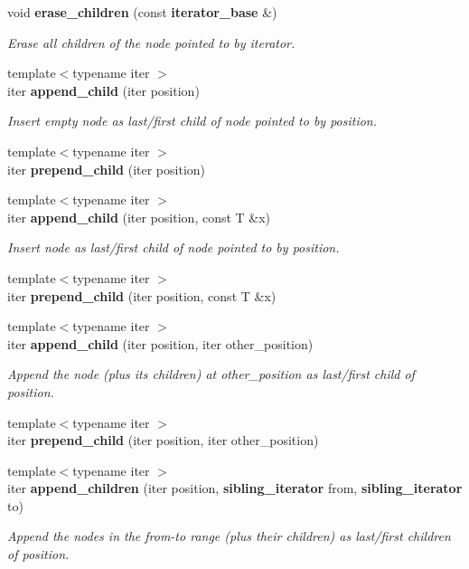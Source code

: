 \begin{DoxyCompactItemize}
void {\bf erase\+\_\+children} (const {\bf iterator\+\_\+base} \&)
\begin{DoxyCompactList}\small\item\em Erase all children of the node pointed to by iterator. \end{DoxyCompactList}\item 
{\footnotesize template$<$typename iter $>$ }\\iter {\bf append\+\_\+child} (iter position)
\begin{DoxyCompactList}\small\item\em Insert empty node as last/first child of node pointed to by position. \end{DoxyCompactList}\item 
{\footnotesize template$<$typename iter $>$ }\\iter {\bf prepend\+\_\+child} (iter position)
\item 
{\footnotesize template$<$typename iter $>$ }\\iter {\bf append\+\_\+child} (iter position, const T \&x)
\begin{DoxyCompactList}\small\item\em Insert node as last/first child of node pointed to by position. \end{DoxyCompactList}\item 
{\footnotesize template$<$typename iter $>$ }\\iter {\bf prepend\+\_\+child} (iter position, const T \&x)
\item 
{\footnotesize template$<$typename iter $>$ }\\iter {\bf append\+\_\+child} (iter position, iter other\+\_\+position)
\begin{DoxyCompactList}\small\item\em Append the node (plus its children) at other\+\_\+position as last/first child of position. \end{DoxyCompactList}\item 
{\footnotesize template$<$typename iter $>$ }\\iter {\bf prepend\+\_\+child} (iter position, iter other\+\_\+position)
\item 
{\footnotesize template$<$typename iter $>$ }\\iter {\bf append\+\_\+children} (iter position, {\bf sibling\+\_\+iterator} from, {\bf sibling\+\_\+iterator} to)
\begin{DoxyCompactList}\small\item\em Append the nodes in the from-\/to range (plus their children) as last/first children of position. \end{DoxyCompactList}\item 

\end{DoxyCompactItemize}
